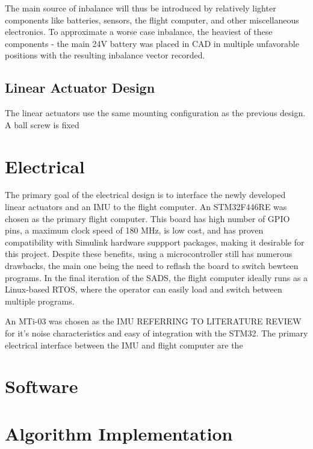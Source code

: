The main source of inbalance will thus be introduced by relatively lighter components like batteries, sensors, the flight computer, and other miscellaneous electronics. To approximate a worse case inbalance, the heaviest of these components - the main 24V battery was placed in CAD in multiple unfavorable positions with the resulting inbalance vector recorded. 


\subsection{Linear Actuator Design}

The linear actuators use the same mounting configuration as the previous design. A ball screw is fixed 


\section{Electrical}

The primary goal of the electrical design is to interface the newly developed linear actuators and an IMU to the flight computer. An STM32F446RE was chosen as the primary flight computer. This board has high number of GPIO pins, a maximum clock speed of 180 MHz, is low cost, and has proven compatibility with Simulink hardware suppport packages, making it desirable for this project. Despite these benefits, using a microcontroller still has numerous drawbacks, the main one being the need to reflash the board to switch bewteen programs. In the final iteration of the SADS, the flight computer ideally runs as a Linux-based RTOS, where the operator can easily load and switch between multiple programs. 

An MTi-03 was chosen as the IMU REFERRING TO LITERATURE REVIEW for it's noise characteristics and easy of integration with the STM32. The primary electrical interface between the IMU and flight computer are the  




\section{Software}




\section{Algorithm Implementation}



